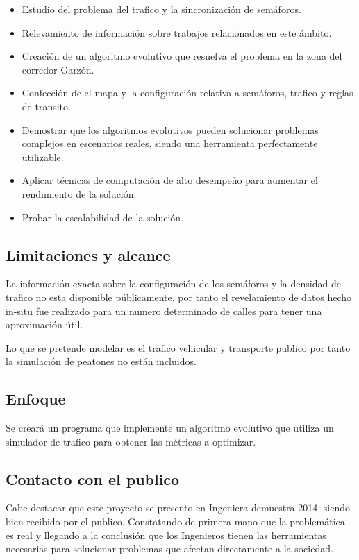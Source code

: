 \begin{itemize}
	\item Estudio del problema del trafico y la sincronización de semáforos.
	\item Relevamiento de información sobre trabajos relacionados en este ámbito.
	\item Creación de un algoritmo evolutivo que resuelva el problema en la zona del corredor Garzón.
	\item Confección de el mapa y la configuración relativa a semáforos, trafico y reglas de transito.	
	\item Demostrar que los algoritmos evolutivos pueden solucionar problemas complejos en escenarios  reales, siendo una herramienta perfectamente utilizable.
	\item Aplicar técnicas de computación de alto desempeño para aumentar el rendimiento de la solución.
	\item Probar la escalabilidad de la solución.
\end{itemize}

\subsection{Limitaciones y alcance}
La información exacta sobre la configuración de los semáforos y la densidad de trafico no esta disponible públicamente, por tanto el revelamiento de datos hecho in-situ fue realizado para un numero determinado de calles para tener una aproximación útil.

Lo que se pretende modelar es el trafico vehicular y transporte publico por tanto la simulación de peatones no están incluidos.

 
\subsection{Enfoque}
Se creará un programa que implemente un algoritmo evolutivo  que utiliza un simulador de trafico para obtener las métricas a optimizar.


\subsection{Contacto con el publico}
Cabe destacar que este proyecto se presento en Ingeniera demuestra 2014, siendo bien recibido por el publico. Constatando de primera mano que la problemática es real y llegando a la conclusión que los Ingenieros tienen las herramientas necesarias para solucionar problemas que afectan directamente a la sociedad.

